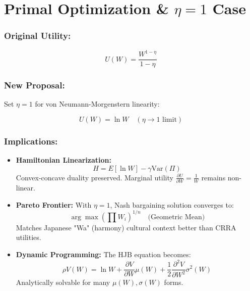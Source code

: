 \documentclass[10pt]{article}
\theoremstyle{definition}
\begin{document}
\section{Primal Optimization \& $\eta = 1$ Case}

\subsubsection{Original Utility:}

\begin{equation}
U(W) = \frac{W^{1-\eta}}{1-\eta}
\end{equation}

\subsubsection{New Proposal:}

Set $\eta = 1$ for von Neumann-Morgenstern linearity:

\begin{equation}
U(W) = \ln W \quad (\eta \rightarrow 1 \text{ limit})
\end{equation}

\subsubsection{Implications:}

\begin{itemize}
    \item \textbf{Hamiltonian Linearization:}
        \begin{equation}
        H = E[\ln W] - \gamma \text{Var}(\Pi)
        \end{equation}
        Convex-concave duality preserved.
        Marginal utility $\frac{\partial U}{\partial W} = \frac{1}{W}$ remains non-linear.
    \item \textbf{Pareto Frontier:}
        With $\eta = 1$, Nash bargaining solution converges to:
        \begin{equation}
        \arg\max \left(\prod W_i\right)^{1/n} \quad \text{(Geometric Mean)}
        \end{equation}
        Matches Japanese "Wa" (harmony) cultural context better than CRRA utilities.
    \item \textbf{Dynamic Programming:}
        The HJB equation becomes:
        \begin{equation}
        \rho V(W) = \ln W + \frac{\partial V}{\partial W} \mu(W) + \frac{1}{2} \frac{\partial^2 V}{\partial W^2} \sigma^2(W)
        \end{equation}
        Analytically solvable for many $\mu(W), \sigma(W)$ forms.
\end{itemize}
\end{document}
